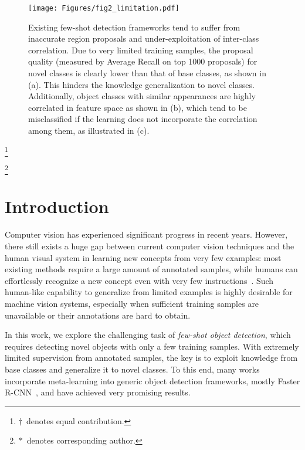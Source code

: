 \documentclass[letterpaper]{article} \usepackage{aaai22}  \usepackage{times}  \usepackage{helvet}  \usepackage{courier}  \usepackage[hyphens]{url}  \usepackage{graphicx} \urlstyle{rm} \def\UrlFont{\rm}  \usepackage{natbib}  \usepackage{caption} \DeclareCaptionStyle{ruled}{labelfont=normalfont,labelsep=colon,strut=off} \frenchspacing  \setlength{\pdfpagewidth}{8.5in}  \setlength{\pdfpageheight}{11in}  \usepackage{algorithm}
\newcommand\blfootnote[1]{\begingroup
\renewcommand\thefootnote{}\footnote{#1}\addtocounter{footnote}{-1}\endgroup
}
\begin{document}
\begin{figure*}[t!] 
\vspace*{-1.66mm}
\begin{center}
   \texttt{[image: Figures/fig2\_limitation.pdf]}
\end{center}
\vspace*{-3.666mm}
\caption{Existing few-shot detection frameworks tend to suffer from inaccurate region proposals and under-exploitation of inter-class correlation. Due to very limited training samples, the proposal quality (measured by Average Recall on top 1000 proposals) for novel classes is clearly lower than that of base classes, as shown in (a). This hinders the knowledge generalization to novel classes. Additionally, object classes with similar appearances are highly correlated in feature space as shown in (b), which tend to be misclassified if the learning does not incorporate the correlation among them, as illustrated in (c).}
\label{fig:fig2_limitation}
\vspace*{-0.5mm}
\end{figure*}


\blfootnote{$\dagger$\, denotes equal contribution.}
\blfootnote{$*$\, denotes corresponding author.}




\section{Introduction}

Computer vision has experienced significant progress in recent years. However, there still exists a huge gap between current computer vision techniques and the human visual system in learning new concepts from very few examples: most existing methods require a large amount of annotated samples, while humans can effortlessly recognize a new concept even with very few instructions~\citep{Landau1988TheIO}. Such human-like capability to generalize from limited examples is highly desirable for machine vision systems, especially when sufficient training samples are unavailable or their annotations are hard to obtain.

In this work, we explore the challenging task of \textit{few-shot object detection}, which requires detecting novel objects with only a few training samples. With extremely limited supervision from annotated samples, the key is to exploit knowledge from base classes and generalize it to novel classes. To this end, many works~\citep{FewshotReweighting,metarcnn,FSDetView,fsod,DenseRelationDistillation} incorporate meta-learning into generic object detection frameworks, mostly Faster R-CNN~\citep{FasterRCNN}, and have achieved very promising results.
\end{document}
